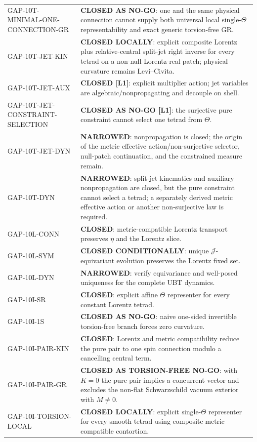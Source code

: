 \documentclass[12pt,a4paper]{article}
\theoremstyle{remark}\newtheorem{remark}[definition]{Remark}
\begin{document}
\begin{longtable}{p{3.0cm}p{8.9cm}}
GAP-10T-MINIMAL-ONE-CONNECTION-GR & \textbf{CLOSED AS NO-GO}: one and the same physical connection cannot supply both universal local single-$\Theta$ representability and exact generic torsion-free GR.\\
GAP-10T-JET-KIN & \textbf{CLOSED LOCALLY}: explicit composite Lorentz plus relative-central split-jet right inverse for every tetrad on a non-null Lorentz-real patch; physical curvature remains Levi--Civita.\\
GAP-10T-JET-AUX & \textbf{CLOSED [L1]}: explicit multiplier action; jet variables are algebraic/nonpropagating and decouple on shell.\\
GAP-10T-JET-CONSTRAINT-SELECTION & \textbf{CLOSED AS NO-GO [L1]}: the surjective pure constraint cannot select one tetrad from $\Theta$.\\
GAP-10T-JET-DYN & \textbf{NARROWED}: nonpropagation is closed; the origin of the metric effective action/non-surjective selector, null-patch continuation, and the constrained measure remain.\\
GAP-10T-DYN & \textbf{NARROWED}: split-jet kinematics and auxiliary nonpropagation are closed, but the pure constraint cannot select a tetrad; a separately derived metric effective action or another non-surjective law is required.\\
GAP-10L-CONN & \textbf{CLOSED}: metric-compatible Lorentz transport preserves $\eta$ and the Lorentz slice.\\
GAP-10L-SYM & \textbf{CLOSED CONDITIONALLY}: unique $\mathcal J$-equivariant evolution preserves the Lorentz fixed set.\\
GAP-10L-DYN & \textbf{NARROWED}: verify equivariance and well-posed uniqueness for the complete UBT dynamics.\\
GAP-10I-SR & \textbf{CLOSED}: explicit affine $\Theta$ representer for every constant Lorentz tetrad.\\
GAP-10I-1S & \textbf{CLOSED AS NO-GO}: naive one-sided invertible torsion-free branch forces zero curvature.\\
GAP-10I-PAIR-KIN & \textbf{CLOSED}: Lorentz and metric compatibility reduce the pure pair to one spin connection modulo a cancelling central term.\\
GAP-10I-PAIR-GR & \textbf{CLOSED AS TORSION-FREE NO-GO}: with $K=0$ the pure pair implies a concurrent vector and excludes the non-flat Schwarzschild vacuum exterior with $M\ne0$.\\
GAP-10I-TORSION-LOCAL & \textbf{CLOSED LOCALLY}: explicit single-$\Theta$ representer for every smooth tetrad using composite metric-compatible contortion.\\

\end{longtable}
\end{document}
